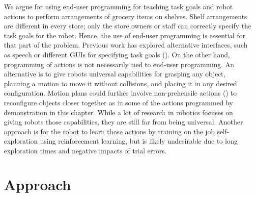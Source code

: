 We argue for using end-user programming for teaching task goals and robot actions to perform arrangements of grocery items on shelves.
Shelf arrangements are different in every store; only the store owners or staff can correctly specify the task goals for the robot. 
Hence, the use of end-user programming is essential for that part of the problem. 
Previous work has explored alternative interfaces, such as speech or different GUIs for specifying task goals (\cite{alexandrova2015roboflow, kurenkov2015,nguyen2013ros}).
On the other hand, programming of actions is not necessarily tied to end-user programming.
An alternative is to give robots universal capabilities for grasping any object, planning a motion to move it without collisions, and placing it in any desired configuration. 
Motion plans could further involve non-prehensile actions (\cite{dogar2010push,king2015nonprehensile}) to reconfigure objects closer together as in some of the actions programmed by demonstration in this chapter. 
While a lot of research in robotics focuses on giving robots those capabilities, they are still far from being universal.
Another approach is for the robot to learn those actions by training on the job \ie self-exploration using reinforcement learning, but is likely undesirable due to long exploration times and negative impacts of trial errors.
\newpage
\section{Approach}
\label{sec:irosorg-approach}


